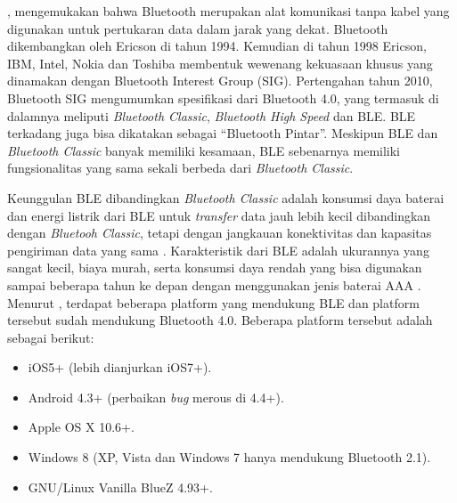 \cite{Keluza2017}, mengemukakan bahwa Bluetooth merupakan alat komunikasi tanpa kabel yang digunakan untuk pertukaran data dalam jarak yang dekat. Bluetooth dikembangkan oleh Ericson di tahun 1994. Kemudian di tahun 1998 Ericson, IBM, Intel, Nokia dan Toshiba membentuk wewenang kekuasaan khusus yang dinamakan dengan Bluetooth Interest Group (SIG). Pertengahan tahun 2010, Bluetooth SIG mengumumkan spesifikasi dari Bluetooth 4.0, yang termasuk di dalamnya meliputi \textit{Bluetooth Classic}, \textit{Bluetooth High Speed} dan BLE. BLE terkadang juga bisa dikatakan sebagai “Bluetooth Pintar”. Meskipun BLE dan \textit{Bluetooth Classic} banyak memiliki kesamaan, BLE sebenarnya memiliki fungsionalitas yang sama sekali berbeda dari \textit{Bluetooth Classic}.

\par Keunggulan BLE dibandingkan \textit{Bluetooth Classic} adalah konsumsi daya baterai dan energi listrik dari BLE untuk \textit{transfer} data jauh lebih kecil dibandingkan dengan \textit{Bluetooh Classic}, tetapi dengan jangkauan konektivitas dan kapasitas pengiriman data yang sama \citep{bluetoothsig2010}. Karakteristik dari BLE adalah ukurannya yang sangat kecil, biaya murah, serta konsumsi daya rendah yang bisa digunakan sampai beberapa tahun ke depan dengan menggunakan jenis baterai AAA \citep{Keluza2017}. Menurut \cite{Paganini2015}, terdapat beberapa platform yang mendukung BLE dan platform tersebut sudah mendukung Bluetooth 4.0. Beberapa platform tersebut adalah sebagai berikut:
\begin {itemize}
\itemsep0em
\item iOS5+ (lebih dianjurkan iOS7+).
\item Android 4.3+ (perbaikan \textit{bug} merous di 4.4+).
\item Apple OS X 10.6+.
\item Windows 8 (XP, Vista dan Windows 7 hanya mendukung Bluetooth 2.1).
\item GNU/Linux Vanilla BlueZ 4.93+.
\end{itemize}

